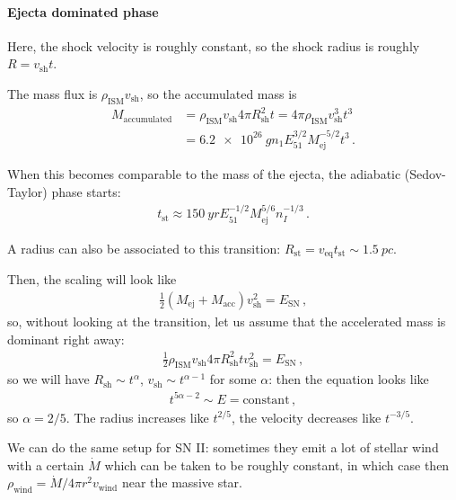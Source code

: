 \documentclass[main.tex]{subfiles}
\begin{document}
\paragraph{Ejecta dominated phase}
Here, the shock velocity is roughly constant, so the shock radius is roughly \(R = v _{\text{sh}} t\). 

The mass flux is \(\rho _{\text{ISM}} v _{\text{sh}}\), so the accumulated mass is 
%
\begin{align}
M _{\text{accumulated}} &= \rho _{\text{ISM}} v _{\text{sh}} 4 \pi R^2 _{\text{sh}} t = 4 \pi \rho _{\text{ISM}} v _{\text{sh}}^3 t^3  \\
&= \SI{6.2e26}{g} n_1 E^{3/2}_{51} M _{\text{ej}}^{-5/2} t^3
\,.
\end{align}

When this becomes comparable to the mass of the ejecta, the adiabatic (Sedov-Taylor) phase starts: 
%
\begin{align}
t _{\text{st}} \approx \SI{150}{yr} E_{51}^{-1/2} M _{\text{ej}}^{5/6} n_I^{-1/3}
\,.
\end{align}

A radius can also be associated to this transition: \(R _{\text{st}} = v _{\text{eq}} t _{\text{st}} \sim \SI{1.5}{pc}\).

Then, the scaling will look like 
%
\begin{align}
\frac{1}{2} \left(M _{\text{ej}} + M _{\text{acc}}\right) v _{\text{sh}}^2 = E _{\text{SN}}
\,,
\end{align}
%
so, without looking at the transition, let us assume that the accelerated mass is dominant right away: 
%
\begin{align}
\frac{1}{2} \rho _{\text{ISM}}  v _{\text{sh}} 4 \pi R _{\text{sh}}^2 t v _{\text{sh}}^2 =  E _{\text{SN}}
\,,
\end{align}
%
so we will have \(R _{\text{sh}} \sim t^{\alpha }\), \(v _{\text{sh}} \sim t^{\alpha - 1}\) for some \(\alpha \): then the equation looks like 
%
\begin{align}
t^{5 \alpha - 2} \sim E = \text{constant}
\,,
\end{align}
%
so \(\alpha = 2 /5 \). 
The radius increases like \(t^{2/5}\), the velocity decreases like \(t^{-3/5}\).

We can do the same setup for SN II: sometimes they emit a lot of stellar wind with a certain \(\dot{M}\) which can be taken to be roughly constant, in which case then \(\rho _{\text{wind}} = \dot{M} / 4 \pi r^2 v _{\text{wind}}\) near the massive star. 
\end{document}

